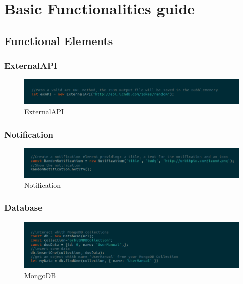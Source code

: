 \section{Basic Functionalities guide}
\subsection{Functional Elements}
\subsubsection{ExternalAPI}
\begin{figure}[H]
	\centering
	\includegraphics[width=14cm]{../../documenti/UserManualFramework/framework_model/1framework_model_api.png}
	\caption{ExternalAPI}
\end{figure}

\subsubsection{Notification}
\begin{figure}[H]
	\centering
	\includegraphics[width=14cm]{../../documenti/UserManualFramework/framework_model/2framework_model_notification.png}
	\caption{Notification}
\end{figure}

\subsubsection{Database}
\begin{figure}[H]
	\centering
	\includegraphics[width=14cm]{../../documenti/UserManualFramework/framework_model/3framework_model_mongo.png}
	\caption{MongoDB}
\end{figure}

